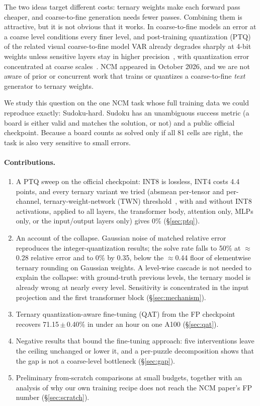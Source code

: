 \documentclass[11pt]{article}
\begin{document}
The two ideas target different costs: ternary weights make each forward pass cheaper, and coarse-to-fine
generation needs fewer passes. Combining them is attractive, but it is not obvious that it works. In
coarse-to-fine models an error at a coarse level conditions every finer level, and post-training quantization
(PTQ) of the related visual coarse-to-fine model VAR already degrades sharply at 4-bit weights unless sensitive
layers stay in higher precision~\citep{litevar}, with quantization error concentrated at coarse
scales~\citep{moon2026shiftsum}. NCM appeared in October 2026, and we are not aware of prior or concurrent work
that trains or quantizes a coarse-to-fine \emph{text} generator to ternary weights.

We study this question on the one NCM task whose full training data we could reproduce exactly: Sudoku-hard.
Sudoku has an unambiguous success metric (a board is either valid and matches the solution, or not) and a public
official checkpoint. Because a board counts as solved only if all 81 cells are right, the task is also very
sensitive to small errors.

\paragraph{Contributions.}
\begin{enumerate}
\item A PTQ sweep on the official checkpoint: INT8 is lossless, INT4 costs 4.4 points, and every ternary variant
we tried (absmean per-tensor and per-channel, ternary-weight-network (TWN) threshold~\citep{li2016twn}, with and
without INT8 activations, applied to all layers, the transformer body, attention only, MLPs only, or the
input/output layers only) gives 0\% (\S\ref{sec:ptq}).
\item An account of the collapse. Gaussian noise of matched relative error reproduces the integer-quantization
results; the solve rate falls to 50\% at $\approx$0.28 relative error and to 0\% by 0.35, below the
$\approx$0.44 floor of elementwise ternary rounding on Gaussian weights. A level-wise cascade is not needed to
explain the collapse: with ground-truth previous levels, the ternary model is already wrong at nearly every
level. Sensitivity is concentrated in the input projection and the first transformer block (\S\ref{sec:mechanism}).
\item Ternary quantization-aware fine-tuning (QAT) from the FP checkpoint recovers 71.15\,$\pm$\,0.40\% in under
an hour on one A100 (\S\ref{sec:qat}).
\item Negative results that bound the fine-tuning approach: five interventions leave the ceiling unchanged or
lower it, and a per-puzzle decomposition shows that the gap is not a coarse-level bottleneck (\S\ref{sec:gap}).
\item Preliminary from-scratch comparisons at small budgets, together with an analysis of why our own training
recipe does not reach the NCM paper's FP number (\S\ref{sec:scratch}).
\end{enumerate}
\end{document}
